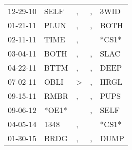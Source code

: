 \begin{supertabular}{lllll}
 12-29-10 &   SELF &             , &  , &   3WID \\
 01-21-11 &   PLUN &             , &  , &   BOTH \\
 02-11-11 &   TIME &             , &    &  *CS1* \\
 03-04-11 &   BOTH &             , &  , &   SLAC \\
 04-22-11 &   BTTM &             , &  , &   DEEP \\
 07-02-11 &   OBLI &  \textgreater &  , &   HRGL \\
 09-15-11 &   RMBR &             , &  , &   PUPS \\
 09-06-12 &  *OE1* &               &  , &   SELF \\
 04-05-14 &   1348 &             , &    &  *CS1* \\
 01-30-15 &   BRDG &             , &  , &   DUMP \\
\end{supertabular}
